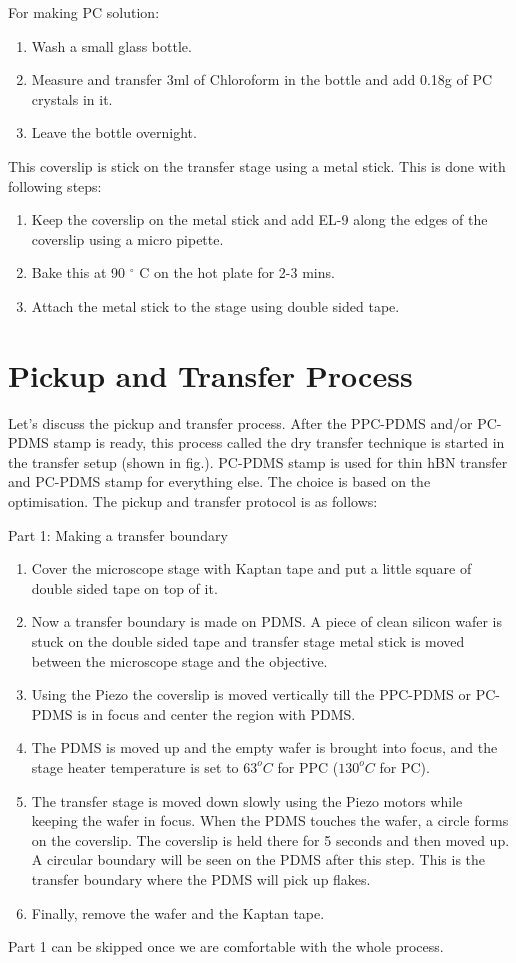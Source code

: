 For making PC solution:
\begin{enumerate}
\item Wash a small glass bottle. 
\item Measure and transfer 3ml of Chloroform in the bottle and add 0.18g of PC crystals in it.
\item Leave the bottle overnight.
\end{enumerate}
This coverslip is stick on the transfer stage using a metal stick. This is done with following steps:
\begin{enumerate}
\item Keep the coverslip on the metal stick and add EL-9 along the edges of the coverslip using a micro pipette.
\item Bake this at 90 $^{\circ}$ C on the hot plate for 2-3 mins.
\item Attach the metal stick to the stage using double sided tape.
\end{enumerate}

\section{Pickup and Transfer Process}

Let's discuss the pickup and transfer process. After the PPC-PDMS and/or PC-PDMS stamp is ready, this process called the dry transfer technique \cite{Kim16} \cite{Wang614} is started in the transfer setup (shown in fig.). PC-PDMS stamp is used for thin hBN transfer and PC-PDMS stamp for everything else. The choice is based on the optimisation. The pickup and transfer protocol is as follows:

Part 1: Making a transfer boundary
\begin{enumerate}
\item Cover the microscope stage with Kaptan tape and put a little square of double sided tape on top of it.
\item Now a transfer boundary is made on PDMS. A piece of clean silicon wafer is stuck on the double sided tape and transfer stage metal stick is moved between the microscope stage and the objective.
\item Using the Piezo the coverslip is moved vertically till the PPC-PDMS or PC-PDMS is in focus and center the region with PDMS. 
\item The PDMS is moved up and the empty wafer is brought into focus, and the stage heater temperature is set to $63 ^o C$ for PPC ($130 ^o C$ for PC).
\item The transfer stage is moved down slowly using the Piezo motors while keeping the wafer in focus. When the PDMS touches the wafer, a circle forms on the coverslip. The coverslip is held there for 5 seconds and then moved up.  A circular boundary will be seen on the PDMS after this step. This is the transfer boundary where the PDMS will pick up flakes.
\item Finally, remove the wafer and the Kaptan tape.
\end{enumerate}
Part 1 can be skipped once we are comfortable with the whole process.

